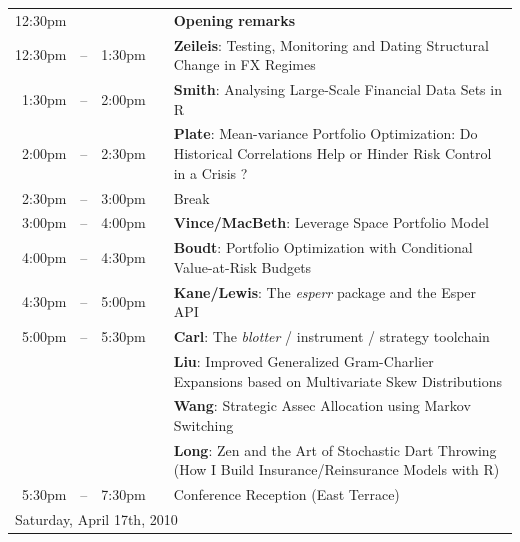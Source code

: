 \documentclass[11pt]{article}
\newcommand{\mylinecolor}[1]{\color{#1}\vspace{-8pt}}  %
\begin{document}
\begin{tabular}{rlrlp{5in}}
  \phantom{X} 12:30pm  & \phantom{m} &  & & \textbf{\color{Breaks} Opening remarks} \\
  12:30pm& -- & 1:30pm &    & \textbf{\color{KeynoteTalk} Zeileis}: \small{Testing, Monitoring and Dating Structural Change in FX Regimes} \\
  1:30pm & -- & 2:00pm &    & \textbf{\color{Talk} Smith}: \small{Analysing Large-Scale Financial Data Sets in R} \\
  2:00pm & -- & 2:30pm &    & \textbf{\color{Talk} Plate}: \small{Mean-variance Portfolio Optimization: Do Historical Correlations Help or Hinder Risk Control in a Crisis ?} \\[0pt]
  2:30pm & -- & 3:00pm &    & \small{\mylinecolor{Breaks} Break} \\
  3:00pm & -- & 4:00pm &    & \textbf{\color{KeynoteTalk} Vince/MacBeth}: \small{Leverage Space Portfolio Model} \\
  4:00pm & -- & 4:30pm &    & \textbf{\color{Talk} Boudt}: \small{Portfolio Optimization with Conditional Value-at-Risk Budgets} \\
  4:30pm & -- & 5:00pm &    & \textbf{\color{Talk} Kane/Lewis}: \small{The \emph{esperr} package and the Esper API} \\
  5:00pm & -- & 5:30pm &    & \textbf{\color{LightningTalk} Carl}: \small{The \emph{blotter} / instrument / strategy toolchain} \\
         &    &        &    & \textbf{\color{LightningTalk} Liu}: \small{Improved Generalized Gram-Charlier Expansions based on Multivariate Skew Distributions} \\
         &    &        &    & \textbf{\color{LightningTalk} Wang}: \small{Strategic Assec Allocation using Markov Switching} \\
         &    &        &    & \textbf{\color{LightningTalk} Long}: \small{Zen and the Art of Stochastic Dart Throwing (How I Build Insurance/Reinsurance Models with R)} \\[0pt]
  5:30pm & -- & 7:30pm &    & \small{\mylinecolor{Breaks} Conference Reception (East Terrace)}  \\[18pt]

  \multicolumn{5}{l}{\Large Saturday, April 17th, 2010} \\


\end{tabular}
\end{document}

